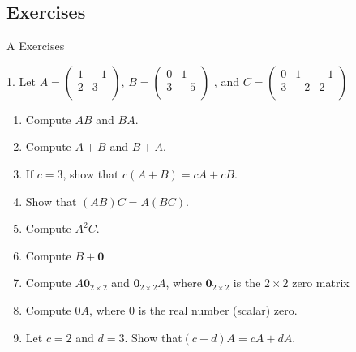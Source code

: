 \documentclass[10pt,]{book}
\theoremstyle{plain}
\theoremstyle{definition}
\theoremstyle{definition}
\theoremstyle{definition}
\theoremstyle{definition}
\begin{document}
\subsection[Exercises]{Exercises}\label{exercises-5-1}
\hypertarget{exercisegroup-1}{}\typeout{************************************************}
\typeout{************************************************}
A Exercises%
\begin{exercisegroup}
\item[1.]\hypertarget{exercise-1}{}Let \(A=\left(
\begin{array}{cc}
 1 & -1 \\
 2 & 3 \\
\end{array}
\right)\), \(B =\left(
\begin{array}{cc}
 0 & 1 \\
 3 & -5 \\
\end{array}
\right)\) , and \(C=\left(
\begin{array}{ccc}
 0 & 1 & -1 \\
 3 & -2 & 2 \\
\end{array}
\right)\) %
\par
\leavevmode%
\begin{enumerate}[label=\alph*]
\item\hypertarget{li-8}{} Compute \(A B\) and \(B A\).%
\item\hypertarget{li-9}{} Compute \(A + B\) and \(B + A\).%
\item\hypertarget{li-10}{} If \(c = 3\), show that \(c(A + B) = c A + c B\).%
\item\hypertarget{li-11}{} Show that \((A B)C = A(B C)\).%
\item\hypertarget{li-12}{} Compute \(A^2 C\).%
\item\hypertarget{li-13}{}  Compute \(B + \pmb{0}\)%
\item\hypertarget{li-14}{} Compute \(A \pmb{0}_{2\times 2}\) and \(\pmb{0}_{2\times 2} A\), where \(\pmb{0}_{2\times 2}\) is the \(2\times 2\) zero matrix%
\item\hypertarget{li-15}{} Compute \(0A\), where 0 is the real number (scalar) zero.%
\item\hypertarget{li-16}{} Let \(c = 2\) and \(d = 3\). Show that\((c + d)A = c A + d A\).%
\end{enumerate}
%
\par\smallskip
\par\smallskip

\end{exercisegroup}
\end{document}
